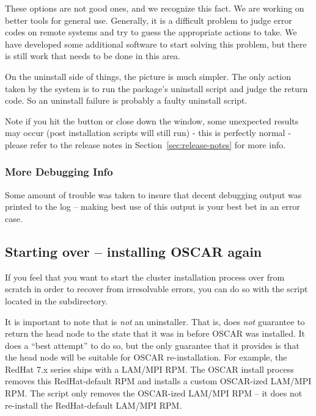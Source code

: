 These options are not good ones, and we recognize this fact.  We are working
on better tools for general use.  Generally, it is a difficult problem to
judge error codes on remote systems and try to guess the appropriate actions
to take.  We have developed some additional software to start solving this
problem, but there is still work that needs to be done in this area.

On the uninstall side of things, the picture is much simpler.  The only
action taken by the system is to run the package's uninstall script and
judge the return code.  So an uninstall failure is probably a faulty
uninstall script.

Note if you hit the  button or close down the window, 
some unexpected results may
occur (post installation scripts will still run) - this is
perfectly normal - please refer to the release notes in 
Section~\ref{sec:release-notes} for more info. 


\subsubsection{More Debugging Info}
\label{det:more-debug-info}

Some amount of trouble was taken to insure that decent debugging output
was printed to the log -- making best use of this output is your best bet
in an error case.

\endchange 

\subsection{Starting over -- installing OSCAR again}

If you feel that you want to start the cluster installation process
over from scratch in order to recover from irresolvable errors, you
can do so with the  script located in the
 subdirectory.

It is important to note that  is {\em not} an
uninstaller.  That is,  does {\em not} guarantee to
return the head node to the state that it was in before OSCAR was
installed.  It does a ``best attempt'' to do so, but the only
guarantee that it provides is that the head node will be suitable for
OSCAR re-installation.  For example, the RedHat 7.x series ships with
a LAM/MPI RPM.  The OSCAR install process removes this RedHat-default
RPM and installs a custom OSCAR-ized LAM/MPI RPM.  The
 script only removes the OSCAR-ized LAM/MPI RPM -- it
does not re-install the RedHat-default LAM/MPI RPM.

